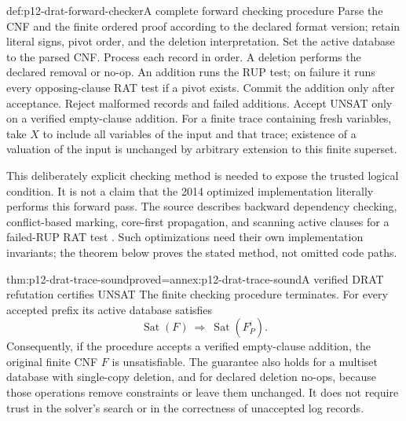 \begin{hbmethod}{def:p12-drat-forward-checker}{A complete forward checking procedure}
Parse the CNF and the finite ordered proof according to the declared format
version; retain literal signs, pivot order, and the deletion interpretation.
Set the active database to the parsed CNF.  Process each record in order.  A
deletion performs the declared removal or no-op.  An addition runs the RUP
test; on failure it runs every opposing-clause RAT test if a pivot exists.
Commit the addition only after acceptance.  Reject malformed records and
failed additions.  Accept UNSAT only on a verified empty-clause addition.
For a finite trace containing fresh variables, take \(X\) to include all
variables of the input and that trace; existence of a valuation of the input
is unchanged by arbitrary extension to this finite superset.

This deliberately explicit checking method is needed to expose the trusted
logical condition.  It is not a claim that the 2014 optimized implementation
literally performs this forward pass.  The source describes backward
dependency checking, conflict-based marking, core-first propagation, and
scanning active clauses for a failed-RUP RAT test
\cite[Sec.~5]{WetzlerHeuleHunt2014AuthorDRAT}.  Such optimizations need their
own implementation invariants; the theorem below proves the stated method,
not omitted code paths.
\end{hbmethod}

\begin{hbtheorem}{thm:p12-drat-trace-sound}{proved=annex:p12-drat-trace-sound}{A verified DRAT refutation certifies UNSAT}
The finite checking procedure terminates.  For every accepted prefix its
active database satisfies
\[
 \operatorname{Sat}(F)\ \Rightarrow\ \operatorname{Sat}(F^i_P).
\]
Consequently, if the procedure accepts a verified empty-clause addition,
the original finite CNF \(F\) is unsatisfiable.  The guarantee also holds
for a multiset database with single-copy deletion, and for declared deletion
no-ops, because those operations remove constraints or leave them unchanged.
It does not require trust in the solver's search or in the correctness of
unaccepted log records.
\end{hbtheorem}

